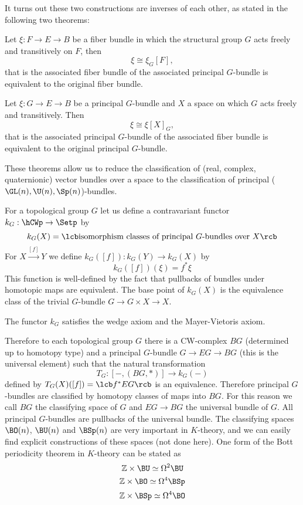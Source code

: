 It turns out these two constructions are inverses of each other, as stated in the following two theorems:

\begin{thm}
Let $\xi : F \rightarrow E \rightarrow B$ be a fiber bundle in which the structural group $G$ acts freely and transitively on $F$, then
\[ \xi \cong \xi_G[F], \]
that is the associated fiber bundle of the associated principal $G$-bundle is equivalent to the original fiber bundle.
\end{thm}

\begin{thm}
Let $\xi : G \rightarrow E \rightarrow B$ be a principal $G$-bundle and $X$ a space on which $G$ acts freely and transitively. Then
\[ \xi \cong \xi[X]_G, \]
that is the associated principal $G$-bundle of the associated fiber bundle is equivalent to the original principal $G$-bundle.
\end{thm}

These theorems allow us to reduce the classification of (real, complex, quaternionic) vector bundles over a space to the classification of principal ($\GL(n),\U(n),\Sp(n)$)-bundles.

For a topological group $G$ let us define a contravariant functor $k_G : \hCWp \rightarrow \Setp$ by
\[ k_G(X) = \lcb \text{isomorphism classes of principal $G$-bundles over $X$} \rcb \]
For $X \stackrel{[f]}{\longrightarrow} Y$ we define $k_G([f]) : k_G(Y) \rightarrow k_G(X)$ by
\[ k_G([f])(\xi) = f^*\xi \]
This function is well-defined by the fact that pullbacks of bundles under homotopic maps are equivalent. The base point of $k_G(X)$ is the equivalence class of the trivial $G$-bundle $G \rightarrow G \times X \rightarrow X$.

\begin{thm}
The functor $k_G$ satisfies the wedge axiom and the Mayer-Vietoris axiom.
\end{thm}

Therefore to each topological group $G$ there is a CW-complex $BG$ (determined up to homotopy type) and a principal $G$-bundle $G \rightarrow EG \rightarrow BG$ (this is the universal element) such that the natural transformation
\[ T_G : [-,(BG,*)] \rightarrow k_G(-) \]
defined by $T_G(X)([f]) = \lcb f^*EG \rcb$ is an equivalence. Therefore principal $G$-bundles are classified by homotopy classes of maps into $BG$. For this reason we call $BG$ the classifying space of $G$ and $EG \rightarrow BG$ the universal bundle of $G$. All principal $G$-bundles are pullbacks of the universal bundle. The classifying spaces $\BO(n)$, $\BU(n)$ and $\BSp(n)$ are very important in $K$-theory, and we can easily find explicit constructions of these spaces (not done here). One form of the Bott periodicity theorem in $K$-theory can be stated as
\[ \mathbb Z \times \BU  \simeq \Omega^2 \BU  \]
\[ \mathbb Z \times \BO  \simeq \Omega^4 \BSp \]
\[ \mathbb Z \times \BSp \simeq \Omega^4 \BO  \]

